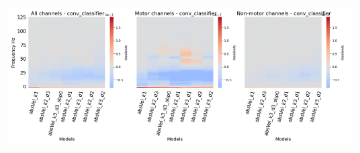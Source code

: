 \begin{figure}[!htpb]
\begin{subfigure}[b]{\textwidth}
   \includegraphics[width=1\linewidth]{img/appendix/A/conv-classifier/sm/absVel-model-gradients_all_kinds}
   \caption{}
   \label{fig:absVel-shifted-grads-conv-classifier}
\end{subfigure}

\caption[]{}
\label{fig:absVel-shifted-grads}
\end{figure}


